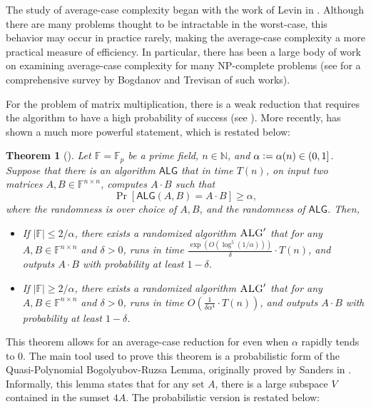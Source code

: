 \documentclass[12pt]{caltech_thesis}
\newcommand{\defeq}{\vcentcolon=}
\def\F{\mathbb{F}}
\newtheorem{theorem}{Theorem}
\begin{document}
The study of average-case complexity began with the work of Levin in \cite{Levin1986}. Although there are many problems thought to be intractable in the worst-case, this behavior may occur in practice rarely, making the average-case complexity a more practical measure of efficiency. In particular, there has been a large body of work on examining average-case complexity for many NP-complete problems (see \cite{bogdanov2021averagecase} for a comprehensive survey by Bogdanov and Trevisan of such works).

For the problem of matrix multiplication, there is a weak reduction that requires the algorithm to have a high probability of success (see ). More recently, \cite{asadi2022worstcase} has shown a much more powerful statement, which is restated below:
\begin{theorem}[\cite{asadi2022worstcase}]
\label{thm:asadi}
    Let $\F = \F_p$ be a prime field, $n \in \mathbb{N}$, and $\alpha \defeq \alpha(n) \in (0, 1]$. Suppose that there is an algorithm $\mathsf{ALG}$ that in time $T(n)$, on input two matrices $A, B \in \F^{n\times n}$, computes $A\cdot B$ such that
    \begin{equation*}
        \Pr[\mathsf{ALG}(A, B) = A\cdot B] \geq \alpha,
    \end{equation*}
    where the randomness is over choice of $A, B$, and the randomness of $\mathsf{ALG}$. Then, 
    \begin{itemize}
        \item If $|\F| \leq 2/\alpha$, there exists a randomized algorithm $\textsc{ALG}'$ that for any $A,B \in \F^{n\times n}$ and $\delta > 0$, runs in time $\frac{\exp(O(\log^5(1/\alpha)))}{\delta}\cdot T(n)$, and outputs $A\cdot B$ with probability at least $1 - \delta$.
        \item If $|\F| \geq 2/\alpha$, there exists a randomized algorithm $\textsc{ALG}'$ that for any $A,B \in \F^{n\times n}$ and $\delta > 0$, runs in time $O(\frac{1}{\delta \alpha^{4}}\cdot T(n))$, and outputs $A\cdot B$ with probability at least $1 - \delta$.
    \end{itemize}
\end{theorem}
This theorem allows for an average-case reduction for even when $\alpha$ rapidly tends to 0. The main tool used to prove this theorem is a probabilistic form of the Quasi-Polynomial Bogolyubov-Ruzsa Lemma, originally proved by Sanders in \cite{Sanders2012}. Informally, this lemma states that for any set $A$, there is a large subspace $V$ contained in the sumset $4A$. The probabilistic version is restated below:
\end{document}

